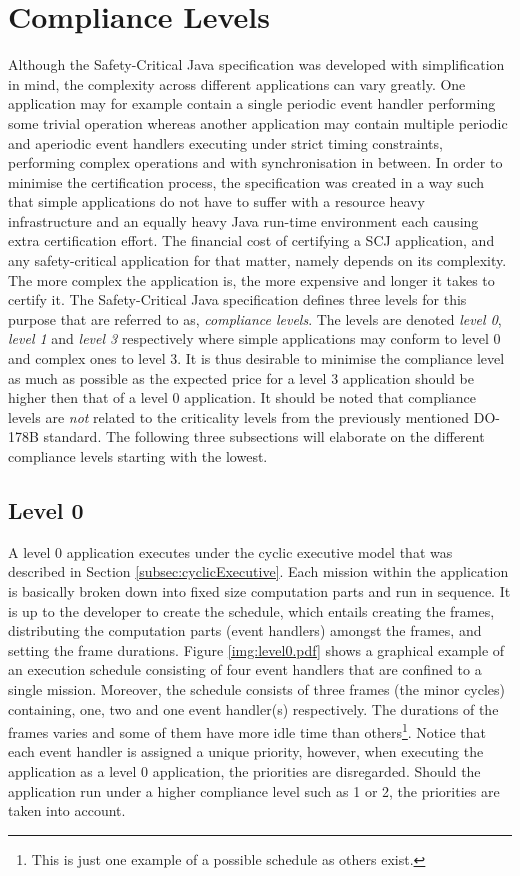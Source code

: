 \section{Compliance Levels}
\label{section:complianceLevels}
Although the Safety-Critical Java specification was developed with simplification in mind, the complexity across different applications can vary greatly. One application may for example contain a single periodic event handler performing some trivial operation whereas another application may contain multiple periodic and aperiodic event handlers executing under strict timing constraints, performing complex operations and with synchronisation in between. In order to minimise the certification process, the specification was created in a way such that simple applications do not have to suffer with a resource heavy infrastructure and an equally heavy Java run-time environment each causing extra certification effort. The financial cost of certifying a SCJ application, and any safety-critical application for that matter, namely depends on its complexity. The more complex the application is, the more expensive and longer it takes to certify it. The Safety-Critical Java specification defines three levels for this purpose that are referred to as, \textit{compliance levels}. The levels are denoted \textit{level 0}, \textit{level 1} and \textit{level 3} respectively where simple applications may conform to level 0 and complex ones to level 3. It is thus desirable to minimise the compliance level as much as possible as the expected price for a level 3 application should be higher then that of a level 0 application. It should be noted that compliance levels are \textit{not} related to the criticality levels from the previously mentioned DO-178B standard. The following three subsections will elaborate on the different compliance levels starting with the lowest.

\subsection{Level 0}
A level 0 application executes under the cyclic executive model that was described in Section \ref{subsec:cyclicExecutive}. Each mission within the application is basically broken down into fixed size computation parts and run in sequence. It is up to the developer to create the schedule, which entails creating the frames, distributing the computation parts (event handlers) amongst the frames, and setting the frame durations. Figure \ref{img:level0.pdf} shows a graphical example of an execution schedule consisting of four event handlers that are confined to a single mission. Moreover, the schedule consists of three frames (the minor cycles) containing, one, two and one event handler(s) respectively. The durations of the frames varies and some of them have more idle time than others\footnote{This is just one example of a possible schedule as others exist.}. Notice that each event handler is assigned a unique priority, however, when executing the application as a level 0 application, the priorities are disregarded. Should the application run under a higher compliance level such as 1 or 2, the priorities are taken into account. 

